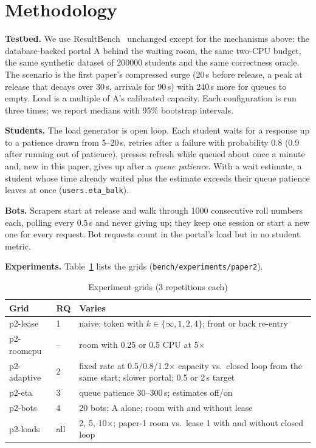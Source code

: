 \section{Methodology}
\label{sec:method}

\textbf{Testbed.} We use ResultBench~\cite{pathak2026surviving} unchanged
except for the mechanisms above: the database-backed portal A behind the
waiting room, the same two-CPU budget, the same synthetic dataset of
\num{200000} students and the same correctness oracle. The scenario is the
first paper's compressed surge (20\,s before release, a peak at release that
decays over 30\,s, arrivals for 90\,s) with 240\,s more for queues to empty.
Load is a multiple of A's calibrated capacity. Each configuration is run
three times; we report medians with 95\% bootstrap intervals.

\textbf{Students.} The load generator is open loop. Each student waits for a
response up to a patience drawn from 5--20\,s, retries after a failure with
probability 0.8 (0.9 after running out of patience), presses refresh while
queued about once a minute and, new in this paper, gives up after a
\emph{queue patience}. With a wait estimate, a student whose time already
waited plus the estimate exceeds their queue patience leaves at once
(\texttt{users.eta\_balk}). 

\textbf{Bots.} Scrapers start at release and walk through \num{1000}
consecutive roll numbers each, polling every 0.5\,s and never giving up; they
keep one session or start a new one for every request. Bot requests count in
the portal's load but in no student metric.

\textbf{Experiments.} Table~\ref{tab:grids} lists the grids
(\texttt{bench/experiments/paper2}).

\begin{table}[t]
\caption{Experiment grids (3 repetitions each)}
\label{tab:grids}
\centering
\footnotesize
\begin{tabular}{@{}llp{4.2cm}@{}}
\toprule
Grid & RQ & Varies \\
\midrule
p2-lease & 1 & naive; token with $k \in \{\infty, 1, 2, 4\}$; front or back re-entry \\
p2-roomcpu & -- & room with 0.25 or 0.5 CPU at 5$\times$ \\
p2-adaptive & 2 & fixed rate at 0.5/0.8/1.2$\times$ capacity vs.\ closed loop from the same start; slower portal; 0.5 or 2\,s target \\
p2-eta & 3 & queue patience 30--300\,s; estimates off/on \\
p2-bots & 4 & 20 bots; A alone; room with and without lease \\
p2-loads & all & 2, 5, 10$\times$; paper-1 room vs.\ lease 1 with and without closed loop \\
\bottomrule
\end{tabular}
\end{table}

